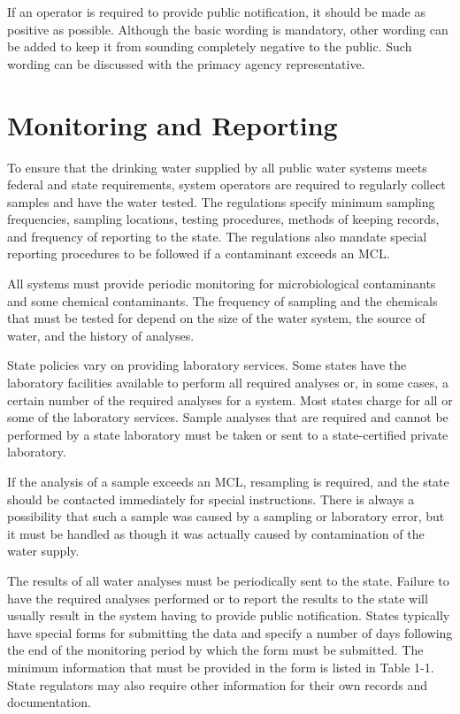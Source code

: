 \documentclass[10pt]{article}
\begin{document}
If an operator is required to provide public notification, it should be made as positive as possible. Although the basic wording is mandatory, other wording can be added to keep it from sounding completely negative to the public. Such wording can be discussed with the primacy agency representative.

\section{Monitoring and Reporting}
To ensure that the drinking water supplied by all public water systems meets federal and state requirements, system operators are required to regularly collect samples and have the water tested. The regulations specify minimum sampling frequencies, sampling locations, testing procedures, methods of keeping records, and frequency of reporting to the state. The regulations also mandate special reporting procedures to be followed if a contaminant exceeds an MCL.

All systems must provide periodic monitoring for microbiological contaminants and some chemical contaminants. The frequency of sampling and the chemicals that must be tested for depend on the size of the water system, the source of water, and the history of analyses.

State policies vary on providing laboratory services. Some states have the laboratory facilities available to perform all required analyses or, in some cases, a certain number of the required analyses for a system. Most states charge for all or some of the laboratory services. Sample analyses that are required and cannot be performed by a state laboratory must be taken or sent to a state-certified private laboratory.

If the analysis of a sample exceeds an MCL, resampling is required, and the state should be contacted immediately for special instructions. There is always a possibility that such a sample was caused by a sampling or laboratory error, but it must be handled as though it was actually caused by contamination of the water supply.

The results of all water analyses must be periodically sent to the state. Failure to have the required analyses performed or to report the results to the state will usually result in the system having to provide public notification. States typically have special forms for submitting the data and specify a number of days following the end of the monitoring period by which the form must be submitted. The minimum information that must be provided in the form is listed in Table 1-1. State regulators may also require other information for their own records and documentation.
\end{document}

